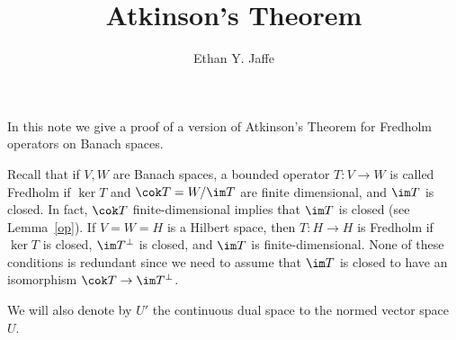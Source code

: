\documentclass[12pt]{article}
\title{Atkinson's Theorem}
\author{Ethan Y. Jaffe}
\date{}
\begin{document}
\maketitle
\setcounter{section}{1}
In this note we give a proof of a version of Atkinson's Theorem for Fredholm operators on Banach spaces.

Recall that if $V,W$ are Banach spaces, a bounded operator $T:V\to W$ is called Fredholm if $\ker T$ and $\cok T = W/\im T$ are finite dimensional, and $\im T$ is closed. In fact, $\cok T$ finite-dimensional implies that $\im T$ is closed (see Lemma~\ref{op}). If $V=W=H$ is a Hilbert space, then $T:H\to H$ is Fredholm if $\ker T$ is closed, $\im T^\bot$ is closed, and $\im T$ is finite-dimensional. None of these conditions is redundant since we need to assume that $\im T$ is closed to have an isomorphism $\cok T \to \im T^\bot$.

We will also denote by $U'$ the continuous dual space to the normed vector space $U$.
\end{document}
